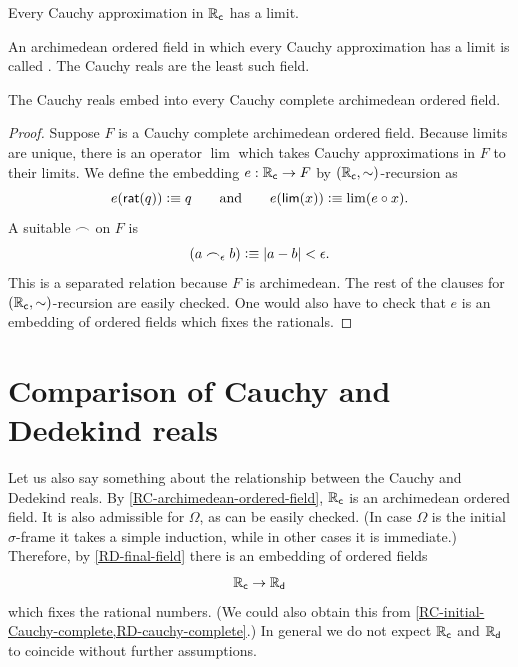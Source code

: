 \begin{thm}
  Every Cauchy approximation in $\mathbb{R}_\mathsf{c}$ has a limit.
\end{thm}

An archimedean ordered field in which every Cauchy approximation has a limit is called
.
%
%
%
The Cauchy reals are the least such field.

\begin{thm} \label{RC-initial-Cauchy-complete}
  The Cauchy reals embed into every Cauchy complete ar\-chi\-me\-de\-an ordered field.
\end{thm}

\begin{proof}
  Suppose $F$ is a Cauchy complete archimedean ordered field. Because limits are unique,
  there is an operator $\lim$ which takes Cauchy approximations in $F$ to their limits. We
  define the embedding $e : \mathbb{R}_\mathsf{c} \to F$ by $(\mathbb{R}_\mathsf{c}, {\mathord\sim})$-recursion as
  \begin{equation*}
    e(\mathsf{rat}(q)) \vcentcolon\equiv q
    \qquad\text{and}\qquad
    e(\mathsf{lim}(x)) \vcentcolon\equiv \lim (e \circ x).
  \end{equation*}
  A suitable $\frown$ on $F$ is
  \begin{equation*}
    (a \frown_\epsilon b) \vcentcolon\equiv |a - b| < \epsilon.
  \end{equation*}
  This is a separated relation because $F$ is archimedean. The rest of the clauses for
  $(\mathbb{R}_\mathsf{c}, {\mathord\sim})$-recursion are easily checked. One would also have to check that $e$ is
  an embedding of ordered fields which fixes the rationals.
\end{proof}

%

\section{Comparison of Cauchy and Dedekind reals}
\label{sec:comp-cauchy-dedek}

%
%

Let us also say something about the relationship between the Cauchy and Dedekind reals. By
\cref{RC-archimedean-ordered-field}, $\mathbb{R}_\mathsf{c}$ is an archimedean ordered field. It is also
admissible for $\Omega$, as can be easily checked. (In case $\Omega$ is the initial
$\sigma$-frame
%
%
it takes a simple induction, while in other cases it is immediate.)
Therefore, by \cref{RD-final-field} there is an embedding of ordered fields
%
\begin{equation*}
  \mathbb{R}_\mathsf{c} \to \mathbb{R}_\mathsf{d}
\end{equation*}
%
which fixes the rational numbers.
(We could also obtain this from \cref{RC-initial-Cauchy-complete,RD-cauchy-complete}.)
In general we do not expect $\mathbb{R}_\mathsf{c}$ and $\mathbb{R}_\mathsf{d}$ to coincide
without further assumptions.

